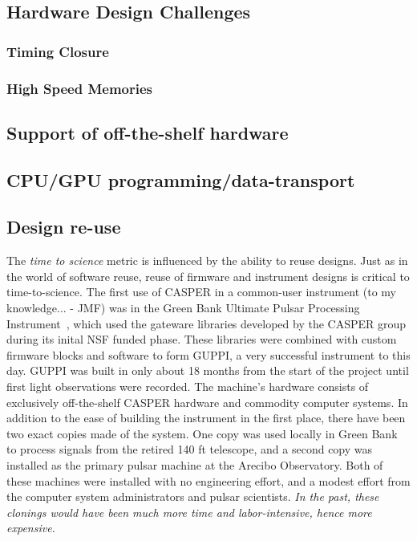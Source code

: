 \documentclass{ws-jai}
\begin{document}
\subsection{Hardware Design Challenges}

\subsubsection{Timing Closure}

\subsubsection{High Speed Memories} \label{sec: HSM}


\subsection{Support of off-the-shelf hardware}

\subsection{CPU/GPU programming/data-transport}

\subsection{Design re-use}
The \emph{time to science} metric is influenced by the ability to
reuse designs.  Just as in the world of software reuse, reuse of
firmware and instrument designs is critical to time-to-science.  The
first use of CASPER in a common-user instrument (to my knowledge... -
JMF) was in the Green Bank Ultimate Pulsar Processing
Instrument~\cite{duplain2008}, which used the gateware libraries
developed by the CASPER group during its inital NSF funded phase.
These libraries were combined with custom firmware blocks and software
to form GUPPI, a very successful instrument to this day.  GUPPI was
built in only about 18 months from the start of the project until
first light observations were recorded.  The machine's hardware
consists of exclusively off-the-shelf CASPER hardware and commodity
computer systems.  In addition to the ease of building the instrument
in the first place, there have been two exact copies made of the
system.  One copy was used locally in Green Bank to process signals
from the retired 140 ft telescope, and a second copy was installed as
the primary pulsar machine at the Arecibo Observatory.  Both of these
machines were installed with no engineering effort, and a modest
effort from the computer system administrators and pulsar scientists.
\emph{In the past, these clonings would have been much more time and
  labor-intensive, hence more expensive.}
\end{document}
